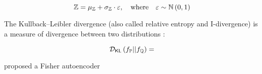 \begin{equation}
 \mathbb{Z} = {\mu_{\mathbb{Z}}} + {\sigma_{\mathbb{Z}}} \cdot \varepsilon, \quad \mbox{where} \quad \varepsilon \sim \mathbb{N}\left(0,1\right)
\end{equation}

The Kullback–Leibler divergence (also called relative entropy and I-divergence) is a measure of divergence between two distributions \citep{KLD1951,csiszar1975}:

\begin{equation}
 \mathcal{D}_{\mathsf{KL}}\left(f_{\mathbb{P}} || f_{\mathbb{Q}} \right) =
\end{equation}

\cite{Zheng2019} proposed a Fisher autoencoder

